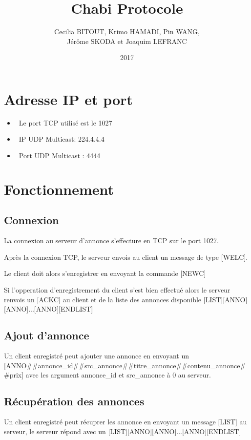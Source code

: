 \documentclass[12pt]{article}
\title{Chabi Protocole}
\author{
  Cecilia BITOUT, Krimo HAMADI, Pin WANG, \\
  Jérôme SKODA et Joaquim LEFRANC
}
\date{2017}
\begin{document}
\maketitle

\section{Adresse IP et port}

\begin{itemize}
  \item~Le port TCP utilisé est le 1027
  \item~IP UDP Multicast: 224.4.4.4
  \item~Port UDP Multicast : 4444
\end{itemize}


\section{Fonctionnement}

\subsection{Connexion}

La connexion au serveur d'annonce s'effecture en TCP sur le port 1027.

Après la connexion TCP, le serveur envois au client un message de type [WELC].

Le client doit alors s'enregistrer en envoyant la commande [NEWC]

Si l'opperation d'enregistrement du client s'est bien effectué alors le serveur renvois un [ACKC] au client et de la liste des annonces disponible [LIST][ANNO][ANNO]...[ANNO][ENDLIST]


\subsection{Ajout d'annonce}

Un client enregistré peut ajouter une annonce en envoyant un [ANNO\#\#annonce\_id\#\#src\_annonce\#\#titre\_annonce\#\#contenu\_annonce\#\#prix] avec les argument annonce\_id et src\_annonce à 0 au serveur.


\subsection{Récupération des annonces}

Un client enregistré peut récuprer les annonce en envoyant un message [LIST] au serveur, le serveur répond avec un [LIST][ANNO][ANNO]...[ANNO][ENDLIST]
\end{document}
